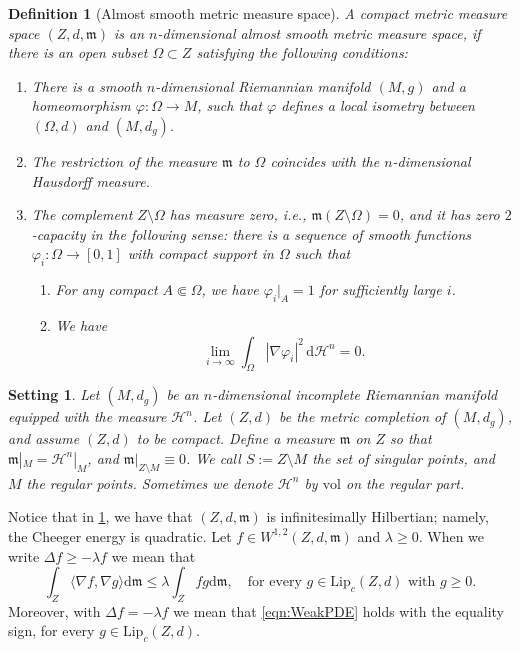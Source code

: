 \documentclass[12pt,a4paper,reqno]{amsart}
\newtheorem{setting}[theorem]{Setting}
\newtheorem{definition}[theorem]{Definition}
\renewcommand{\leq}{\leqslant}
\renewcommand{\geq}{\geqslant}
\begin{document}
\begin{definition}[Almost smooth metric measure space]\label{def:AlmostSmooth}
A compact metric measure space $(Z, d, \mathfrak{m})$ is an \textit{$n$-dimensional almost smooth metric measure space}, if there is an open subset $\Omega \subset Z$ satisfying the following conditions:
\begin{enumerate}
    \item There is a smooth $n$-dimensional Riemannian manifold $(M, g)$ and a homeomorphism $\varphi : \Omega \to M$, such that $\varphi$ defines a local isometry between $(\Omega, d)$ and $(M, d_g)$.
    \item The restriction of the measure $\mathfrak{m}$ to $\Omega$ coincides with the $n$-dimensional Hausdorff measure.
    \item The complement $Z \setminus \Omega$ has measure zero, i.e., $\mathfrak{m}(Z \setminus \Omega) = 0$, and it has zero $2$-capacity in the following sense: there is a sequence of smooth functions $\varphi_i : \Omega \to [0,1]$ with compact support in $\Omega$ such that
    \begin{enumerate}
        \item For any compact $A \Subset \Omega$, we have $\varphi_i|_A = 1$ for sufficiently large $i$.
        \item We have
        \begin{equation}
            \lim_{i\to\infty} \int_{\Omega} |\nabla \varphi_i|^2 \, \mathrm{d}\mathcal{H}^n = 0.
        \end{equation}
    \end{enumerate}
\end{enumerate}
\end{definition}

\begin{setting}\label{Setting}
    Let $(M,d_g)$ be an $n$-dimensional incomplete Riemannian manifold equipped with the measure $\mathcal{H}^n$. Let $(Z,d)$ be the metric completion of $(M,d_g)$, and assume $(Z,d)$ to be compact. Define a measure $\mathfrak{m}$ on $Z$ so that $\mathfrak{m}|_M=\mathcal{H}^n|_M$, and $\mathfrak{m}|_{Z\setminus M}\equiv 0$. We call $S:=Z\setminus M$ the set of \textit{singular} points, and $M$ the regular points. Sometimes we denote $\mathcal{H}^n$ by $\mathrm{vol}$ on the regular part. 
\end{setting} 

Notice that in \cref{Setting}, we have that $(Z,d,\mathfrak{m})$ is infinitesimally Hilbertian; namely, the Cheeger energy is quadratic. Let $f\in W^{1,2}(Z,d,\mathfrak m)$ and $\lambda\geq 0$. When we write $\Delta f\geq -\lambda f$ we mean that 
\begin{equation}\label{eqn:WeakPDE}
\int_Z \langle \nabla f,\nabla g\rangle \mathrm{d}\mathfrak{m} \leq \lambda\int_Z fg \mathrm{d}\mathfrak{m}, \quad \text{for every $g\in \mathrm{Lip}_c(Z,d)$ with $g\geq 0$.}
\end{equation}
Moreover, with $\Delta f=-\lambda f$ we mean that \eqref{eqn:WeakPDE} holds with the equality sign, for every $g\in \mathrm{Lip}_c(Z,d)$.
\end{document}
